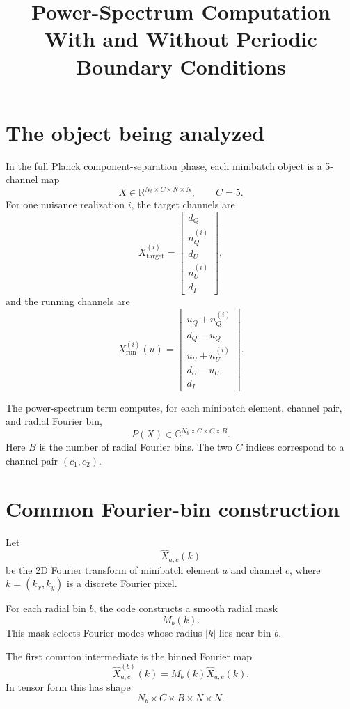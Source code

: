 \documentclass[11pt]{article}
\title{Power-Spectrum Computation With and Without Periodic Boundary Conditions}
\author{}
\date{}
\begin{document}
\maketitle

\section{The object being analyzed}

In the full Planck component-separation phase, each minibatch object is a
5-channel map
\[
  X \in \mathbb{R}^{N_b\times C\times N\times N},
  \qquad C=5.
\]
For one nuisance realization $i$, the target channels are
\[
  X_{\mathrm{target}}^{(i)}
  =
  \begin{bmatrix}
    d_Q\\
    n_Q^{(i)}\\
    d_U\\
    n_U^{(i)}\\
    d_I
  \end{bmatrix},
\]
and the running channels are
\[
  X_{\mathrm{run}}^{(i)}(u)
  =
  \begin{bmatrix}
    u_Q+n_Q^{(i)}\\
    d_Q-u_Q\\
    u_U+n_U^{(i)}\\
    d_U-u_U\\
    d_I
  \end{bmatrix}.
\]

The power-spectrum term computes, for each minibatch element, channel pair,
and radial Fourier bin,
\[
  P(X)\in\mathbb{C}^{N_b\times C\times C\times B}.
\]
Here $B$ is the number of radial Fourier bins. The two $C$ indices correspond
to a channel pair $(c_1,c_2)$.

\section{Common Fourier-bin construction}

Let
\[
  \widehat X_{a,c}(k)
\]
be the 2D Fourier transform of minibatch element $a$ and channel $c$, where
$k=(k_x,k_y)$ is a discrete Fourier pixel.

For each radial bin $b$, the code constructs a smooth radial mask
\[
  M_b(k).
\]
This mask selects Fourier modes whose radius $|k|$ lies near bin $b$.

The first common intermediate is the binned Fourier map
\[
  \widehat X^{(b)}_{a,c}(k)
  =
  M_b(k)\widehat X_{a,c}(k).
\]
In tensor form this has shape
\[
  N_b\times C\times B\times N\times N.
\]
\end{document}
